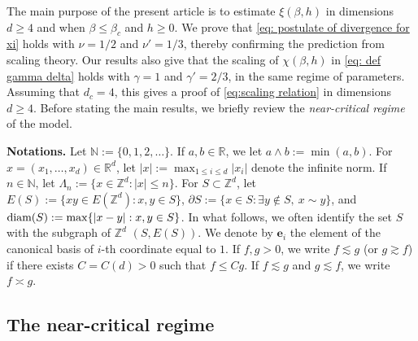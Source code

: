 \documentclass[11pt,a4paper]{article}
\numberwithin{equation}{section}
\theoremstyle{plain}
\theoremstyle{definition}
\begin{document}
\vspace{4pt}

The main purpose of the present article is to estimate $\xi(\beta,h)$ in dimensions $d\geq 4$ and when $\beta\leq\beta_c$ and $h\geq 0$. We prove that \eqref{eq: postulate of divergence for xi} holds with $\nu=1/2$ and $\nu'=1/3$, thereby confirming the prediction from scaling theory. Our results also give that the scaling of $\chi(\beta,h)$ in \eqref{eq: def gamma delta} holds with $\gamma=1$ and $\gamma'=2/3$, in the same regime of parameters. Assuming that $d_c=4$, this gives a proof of \eqref{eq:scaling relation} in dimensions $d\geq 4$. Before stating the main results, we briefly review the \emph{near-critical regime} of the model.

\vspace{4pt}

\noindent\textbf{Notations.}
Let $\mathbb N:=\{0,1,2,\ldots\}$. If $a,b\in \mathbb R$, we let $a\wedge b:=\min(a,b)$. For $x=(x_1,\ldots,x_d)\in\mathbb R^d$, let $|x|:=\max_{1\leq i\leq d}|x_i|$ denote
the infinite norm. If $n\in \mathbb N$, let $\Lambda_n:=\{x\in \mathbb Z^d: |x|\leq n\}$. For $S\subset\mathbb Z^d$, let
$E(S):=\{xy\in E(\mathbb Z^d):x,y\in S\}$, $\partial S:=\{x\in S: \exists y\notin S, \: x\sim y\}$, and $\textup{diam}(S):=\max\{|x-y|: x,y\in S\}$. In what follows, we often identify the set $S$ with the subgraph of $\mathbb Z^d$ $(S,E(S))$. We denote by $\mathbf{e}_i$ the element of the canonical basis of $i$-th coordinate equal to $1$. If $f,g>0$, we write $f\lesssim g$ (or $g\gtrsim f$) if there exists $C=C(d)>0$ such that $f\leq Cg$. If $f\lesssim g$ and $g\lesssim f$, we write $f\asymp g$.

\subsection{The near-critical regime}
\end{document}
